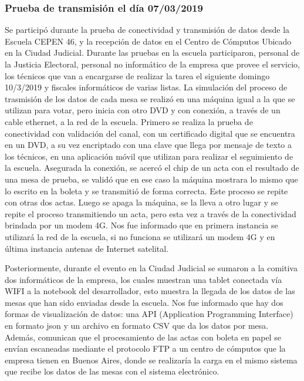 \subsubsection{Prueba de transmisión el día 07/03/2019}
Se participó durante la prueba de conectividad y transmisión de datos desde la Escuela CEPEN 46, y la recepción de datos en el Centro de Cómputos Ubicado en la Ciudad Judicial.\newline
Durante las pruebas en la escuela participaron, personal de la Justicia Electoral, personal no informático de la empresa que provee el servicio, los técnicos que van a encargarse de realizar la tarea el siguiente domingo 10/3/2019 y fiscales informáticos de varias listas.\newline
La simulación del proceso de trasmisión de los datos de cada mesa se realizó en una máquina igual a la que se utilizan para votar, pero inicia con otro DVD y con conexión, a través de un cable ethernet, a la red de la escuela. Primero se realiza la prueba de conectividad con validación del canal, con un certificado digital que se encuentra en un DVD, a su vez encriptado con una clave que llega por mensaje de texto a los técnicos, en una aplicación móvil que utilizan para realizar el seguimiento de la escuela.\newline
Asegurada la conexión, se acercó el chip de un acta con el resultado de una mesa de prueba, se validó que en ese caso la máquina mostrara lo mismo que lo escrito en la boleta y se transmitió de forma correcta. Este proceso se repite con otras dos actas. Luego se apaga la máquina, se la lleva a otro lugar y se repite el proceso transmitiendo un acta, pero esta vez a través de la conectividad brindada por un modem 4G.
Nos fue informado que en primera instancia se utilizará la red de la escuela, si no funciona se utilizará un modem 4G y en última instancia antenas de Internet satelital.\newline

Posteriormente, durante el evento en la Ciudad Judicial se sumaron a la comitiva dos informáticos de la empresa, los cuales muestran una tablet conectada vía WIFI a la notebook del desarrollador, esto muestra la llegada de los datos de las mesas que han sido enviadas desde la escuela. Nos fue informado que hay dos formas de visualización de datos: una API (Application Programming Interface) en formato json y un archivo en formato CSV que da los datos por mesa. Además, comunican que el procesamiento de las actas con boleta en papel se envían escaneadas mediante el protocolo FTP a un centro de cómputos que la empresa tienen en Buenos Aires, donde se realizaría la carga en el mismo sistema que recibe los datos de las mesas con el sistema electrónico.\newline

